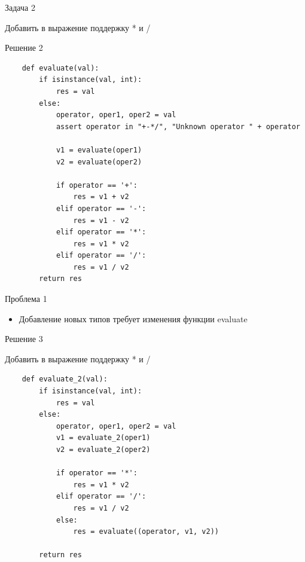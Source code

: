 \documentclass{article}
\begin{document}
\begin{center} Задача 2 \end{center}
    Добавить в выражение поддержку * и /
\newpage

\begin{center} Решение 2 \end{center}
\begin{lstlisting}
    def evaluate(val):
        if isinstance(val, int):
            res = val
        else:
            operator, oper1, oper2 = val
            assert operator in "+-*/", "Unknown operator " + operator

            v1 = evaluate(oper1)
            v2 = evaluate(oper2)

            if operator == '+':
                res = v1 + v2
            elif operator == '-':
                res = v1 - v2
            elif operator == '*':
                res = v1 * v2
            elif operator == '/':
                res = v1 / v2
        return res
\end{lstlisting}
\newpage

\begin{center} Проблема 1 \end{center}
\begin{itemize}
    \item Добавление новых типов требует изменения функции evaluate
\end{itemize}
\newpage

\begin{center} Решение 3 \end{center}
    Добавить в выражение поддержку * и /
\begin{lstlisting}
    def evaluate_2(val):
        if isinstance(val, int):
            res = val
        else:
            operator, oper1, oper2 = val
            v1 = evaluate_2(oper1)
            v2 = evaluate_2(oper2)

            if operator == '*':
                res = v1 * v2
            elif operator == '/':
                res = v1 / v2
            else:
                res = evaluate((operator, v1, v2))

        return res
\end{lstlisting}
\newpage
\end{document}
